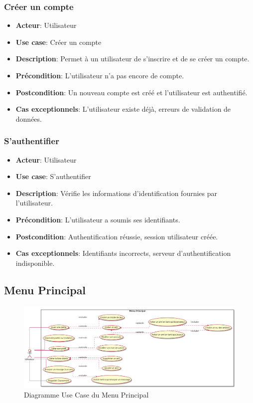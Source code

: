 \documentclass{article}
\begin{document}
\subsubsection*{Créer un compte}
\begin{itemize}
    \item \textbf{Acteur}: Utilisateur
    \item \textbf{Use case}: Créer un compte
    \item \textbf{Description}: Permet à un utilisateur de s’inscrire et de se créer un compte.
    \item \textbf{Précondition}: L’utilisateur n’a pas encore de compte.
    \item \textbf{Postcondition}: Un nouveau compte est créé et l'utilisateur est authentifié.
    \item \textbf{Cas exceptionnels}: L'utilisateur existe déjà, erreurs de validation de données.
\end{itemize}

\subsubsection*{S'authentifier}
\begin{itemize}
    \item \textbf{Acteur}: Utilisateur
    \item \textbf{Use case}: S'authentifier
    \item \textbf{Description}: Vérifie les informations d'identification fournies par l'utilisateur.
    \item \textbf{Précondition}: L'utilisateur a soumis ses identifiants.
    \item \textbf{Postcondition}: Authentification réussie, session utilisateur créée.
    \item \textbf{Cas exceptionnels}: Identifiants incorrects, serveur d’authentification indisponible.
\end{itemize}

\newpage

\subsection{Menu Principal}

\begin{figure}[!h]
    \centering
    \includegraphics[width=1\textwidth]{../res/uml/usecase/MenuPrincipalUseCase.png}
    \caption{Diagramme Use Case du Menu Principal}
    \label{fig:main-menu}
\end{figure}
\end{document}
